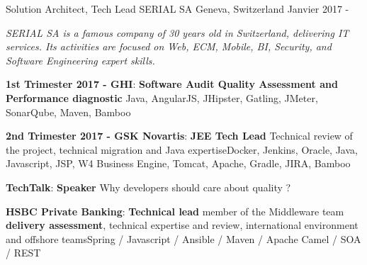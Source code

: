 

\begin{cventries}
    
    \cventry
    {Solution Architect, Tech Lead} %
    {SERIAL SA} %
    {Geneva, Switzerland} %
    {Janvier 2017 - } %
    {
        \begin{cvitems} %
            \item {\textit{SERIAL SA is a famous company of 30 years old in Switzerland, delivering IT services. Its activities are focused on Web, ECM, Mobile, BI, Security, and Software Engineering expert skills.}}
            \item { \textbf{1st Trimester 2017 - GHI}: \textbf{Software Audit Quality Assessment and Performance diagnostic} \newline Java, AngularJS, JHipster, Gatling, JMeter, SonarQube, Maven, Bamboo}
            \item { \textbf{2nd Trimester 2017 - GSK Novartis}: \textbf{JEE Tech Lead} \newline Technical review of the project, technical migration and Java expertise\newline Docker, Jenkins, Oracle, Java, Javascript, JSP, W4 Business Engine, Tomcat, Apache, Gradle, JIRA, Bamboo}	
            \item { \textbf{TechTalk}: \textbf{Speaker} \newline Why developers should care about quality ?}		
            \item { \textbf{HSBC Private Banking}: \textbf{Technical lead} \newline member of the Middleware team  \textbf{delivery assessment}, technical expertise and review, international environment and offshore teams\newline Spring / Javascript / Ansible / Maven / Apache Camel / SOA / REST}		
        \end{cvitems}
    }
    

\end{cventries}

